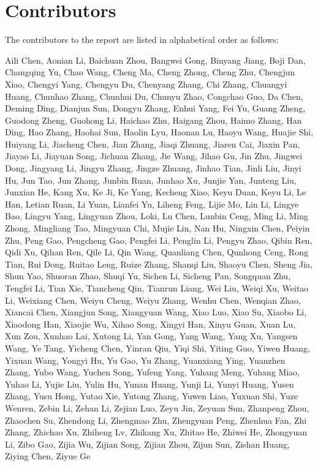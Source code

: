 \appendix

\newpage

\section{Contributors}
The contributors to the report are listed in alphabetical order as follows:


Aili Chen,
Aonian Li,
Baichuan Zhou,
Bangwei Gong,
Binyang Jiang,
Boji Dan,
Changqing Yu,
Chao Wang,
Cheng Ma,
Cheng Zhong,
Cheng Zhu,
Chengjun Xiao,
Chengyi Yang,
Chengyu Du,
Chenyang Zhang,
Chi Zhang,
Chuangyi Huang,
Chunhao Zhang,
Chunhui Du,
Chunyu Zhao,
Congchao Guo,
Da Chen,
Deming Ding,
Dianjun Sun,
Dongyu Zhang,
Enhui Yang,
Fei Yu,
Guang Zheng,
Guodong Zheng,
Guohong Li,
Haichao Zhu,
Haigang Zhou,
Haimo Zhang,
Han Ding,
Hao Zhang,
Haohai Sun,
Haolin Lyu,
Haonan Lu,
Haoyu Wang,
Huajie Shi,
Huiyang Li,
Jiacheng Chen,
Jian Zhang,
Jiaqi Zhuang,
Jiaren Cai,
Jiaxin Pan,
Jiayao Li,
Jiayuan Song,
Jichuan Zhang,
Jie Wang,
Jihao Gu,
Jin Zhu,
Jingwei Dong,
Jingyang Li,
Jingyu Zhang,
Jingze Zhuang,
Jinhao Tian,
Jinli Liu,
Jinyi Hu,
Jun Tao,
Jun Zhang,
Junbin Ruan,
Junhao Xu,
Junjie Yan,
Junteng Liu,
Junxian He,
Kang Xu,
Ke Ji,
Ke Yang,
Kecheng Xiao,
Keyu Duan,
Keyu Li,
Le Han,
Letian Ruan,
Li Yuan,
Lianfei Yu,
Liheng Feng,
Lijie Mo,
Lin Li,
Lingye Bao,
Lingyu Yang,
Lingyuan Zhou,
Loki,
Lu Chen,
Lunbin Ceng,
Ming Li,
Ming Zhong,
Mingliang Tao,
Mingyuan Chi,
Mujie Lin,
Nan Hu,
Ningxin Chen,
Peiyin Zhu,
Peng Gao,
Pengcheng Gao,
Pengfei Li,
Penglin Li,
Pengyu Zhao,
Qibin Ren,
Qidi Xu,
Qihan Ren,
Qile Li,
Qin Wang,
Quanliang Chen,
Qunhong Ceng,
Rong Tian,
Rui Dong,
Ruitao Leng,
Ruize Zhang,
Shanqi Liu,
Shaoyu Chen,
Sheng Jia,
Shun Yao,
Shuoran Zhao,
Shuqi Yu,
Sichen Li,
Sicheng Pan,
Songquan Zhu,
Tengfei Li,
Tian Xie,
Tiancheng Qin,
Tianrun Liang,
Wei Liu,
Weiqi Xu,
Weitao Li,
Weixiang Chen,
Weiyu Cheng,
Weiyu Zhang,
Wenhu Chen,
Wenqian Zhao,
Xiancai Chen,
Xiangjun Song,
Xiangyuan Wang,
Xiao Luo,
Xiao Su,
Xiaobo Li,
Xiaodong Han,
Xiaojie Wu,
Xihao Song,
Xingyi Han,
Xinyu Guan,
Xuan Lu,
Xun Zou,
Xunhao Lai,
Xutong Li,
Yan Gong,
Yang Wang,
Yang Xu,
Yangsen Wang,
Ye Tang,
Yicheng Chen,
Yinran Qiu,
Yiqi Shi,
Yiting Guo,
Yiwen Huang,
Yixuan Wang,
Yongyi Hu,
Yu Gao,
Yu Zhang,
Yuanxiang Ying,
Yuanzhen Zhang,
Yubo Wang,
Yuchen Song,
Yufeng Yang,
Yuhang Meng,
Yuhang Miao,
Yuhao Li,
Yujie Liu,
Yulin Hu,
Yunan Huang,
Yunji Li,
Yunyi Huang,
Yusen Zhang,
Yusu Hong,
Yutao Xie,
Yutong Zhang,
Yuwen Liao,
Yuxuan Shi,
Yuze Wenren,
Zebin Li,
Zehan Li,
Zejian Luo,
Zeyu Jin,
Zeyuan Sun,
Zhanpeng Zhou,
Zhaochen Su,
Zhendong Li,
Zhengmao Zhu,
Zhengyuan Peng,
Zhenhua Fan,
Zhi Zhang,
Zhichao Xu,
Zhiheng Lv,
Zhikang Xu,
Zhitao He,
Zhiwei He,
Zhongyuan Li,
Zibo Gao,
Zijia Wu,
Zijian Song,
Zijian Zhou,
Zijun Sun,
Zishan Huang,
Ziying Chen,
Ziyue Ge
